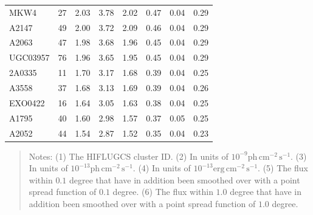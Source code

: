 \documentclass[10pt,aps,pra,reprint,amsmath,amsfonts,amssymb,showpacs,nofootinbib,floatfix]{revtex4-1}
\newcommand{\rmn}{\mathrm}
\begin{document}
\begin{table}
\begin{minipage}{2.0\columnwidth}
\begin{tabular}{l  c c c c c c c}
MKW4     &  27 &   2.03 &   3.78 &   2.02 &   0.47 &   0.04 &   0.29 \\
A2147    &  49 &   2.00 &   3.72 &   2.09 &   0.46 &   0.04 &   0.29 \\
A2063    &  47 &   1.98 &   3.68 &   1.96 &   0.45 &   0.04 &   0.29 \\
UGC03957 &  76 &   1.96 &   3.65 &   1.95 &   0.45 &   0.04 &   0.29 \\
2A0335   &  11 &   1.70 &   3.17 &   1.68 &   0.39 &   0.04 &   0.25 \\
A3558    &  37 &   1.68 &   3.13 &   1.69 &   0.39 &   0.04 &   0.26 \\
EXO0422  &  16 &   1.64 &   3.05 &   1.63 &   0.38 &   0.04 &   0.25 \\
A1795    &  40 &   1.60 &   2.98 &   1.57 &   0.37 &   0.05 &   0.25 \\
A2052    &  44 &   1.54 &   2.87 &   1.52 &   0.35 &   0.04 &   0.23 \\
\hline
\hline
\end{tabular}
\begin{quote}
  Notes: 
   (1) The HIFLUGCS cluster ID.
   (2) In units of  $10^{-9} \rmn{ph}\,\rmn{cm}^{-2}\,\rmn{s}^{-1}$.
   (3) In units of  $10^{-13} \rmn{ph}\,\rmn{cm}^{-2}\,\rmn{s}^{-1}$.
   (4) In units of  $10^{-13} \rmn{erg}\,\rmn{cm}^{-2}\,\rmn{s}^{-1}$.
   (5) The flux within $0.1$ degree that have in addition been smoothed over with a point spread function of $0.1$ degree. 
   (6) The flux within $1.0$ degree that have in addition been smoothed over with a point spread function of $1.0$ degree. 
 \label{tab:flux_tab_LP}
  \end{quote}
\end{minipage}
\end{table} 
\end{document}

